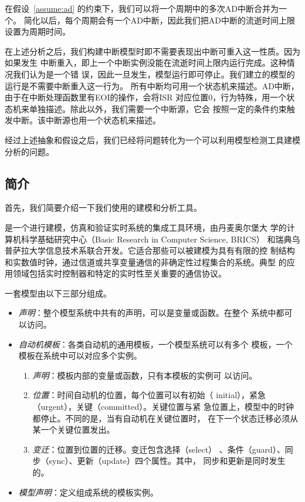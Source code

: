 在假设~\ref{assume:ad} 的约束下，我们可以将一个周期中的多次AD中断合并为一个。
简化以后，每个周期会有一个AD中断，因此我们把AD中断的流逝时间上限设置为周期时间。

在上述分析之后，我们构建中断模型时即不需要表现出中断可重入这一性质。因为如果发生
中断重入，即上一个中断实例没能在流逝时间上限内运行完成。这种情况我们认为是一个错
误，因此一旦发生，模型运行即可停止。我们建立的模型的运行是不需要中断重入这一行为。
所有中断均可用一个状态机来描述。AD中断，由于在中断处理函数里有EOI的操作，会将ISR
对应位置0，行为特殊，用一个状态机来单独描述。除此以外，我们需要一个中断源，它会
按照一定的条件约束触发中断。该中断源也用一个状态机来描述。

经过上述抽象和假设之后，我们已经将问题转化为一个可以利用模型检测工具建模分析的问题。

\subsection{\uppaal 简介}
\label{sec:Uppaal_intro}

首先，我们简要介绍一下我们使用的建模和分析工具\uppaal。

\uppaal 是一个进行建模，仿真和验证实时系统的集成工具环境，由丹麦奥尔堡大
学的计算机科学基础研究中心（Basic Research in Computer Science, BRICS）
和瑞典乌普萨拉大学信息技术系联合开发。它适合那些可以被建模为具有有限的控
制结构和实数值时钟，通过信道或共享变量通信的非确定性过程集合的系统。典型
的应用领域包括实时控制器和特定的实时性至关重要的通信协议。\cite{Behrmann04atutorial}

一套\uppaal 模型由以下三部分组成。
\begin{itemize}
	\item \emph{声明}：整个模型系统中共有的声明，可以是变量或函数。在整个
	系统中都可以访问。
	\item \emph{自动机模板}：各类自动机的通用模板，一个模型系统可以有多个
	模板，一个模板在系统中可以对应多个实例。
	\begin{enumerate}[(1)]
		\item \emph{声明}：模板内部的变量或函数，只有本模板的实例可
		以访问。
		\item \emph{位置}：时间自动机的位置，每个位置可以有初始（
		initial），紧急（urgent），关键（committed）。关键位置与紧
		急位置上，模型中的时钟都停止。不同的是，当有自动机在关键位置时，
		在下一个状态迁移必须从某一个关键位置发出。
		\item \emph{变迁}：位置到位置的迁移。变迁包含选择（select）
		、条件（guard）、同步（sync）、更新（update）四个属性。其中，
		同步和更新是同时发生的。
	\end{enumerate}	
	\item \emph{模型声明}：定义组成系统的模板实例。
\end{itemize}

